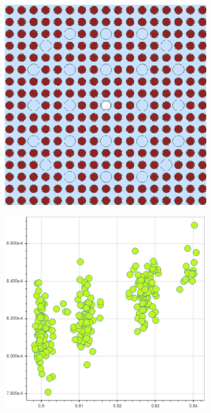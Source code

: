 \documentclass[12pt,twoside]{mitthesis-exec}
\begin{document}
\begin{figure}[h!]
\centering
\begin{subfigure}{0.45\textwidth}
  \centering
  \includegraphics[width=0.9\linewidth]{figures/unsupervised/features/assm-16/geometry}
  \caption{}
  \label{fig:capt-mean-std-geom}
\end{subfigure}%
\begin{subfigure}{0.45\textwidth}
  \centering
  \includegraphics[width=0.9\linewidth]{figures/unsupervised/features/assm-16/u238-capt/mean-std/mgxs}

\end{subfigure}
\end{figure}
\end{document}
